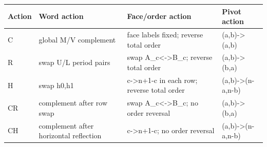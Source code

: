 \begin{tabular}{llll}
\toprule
Action & Word action & Face/order action & Pivot action \\
\midrule
C & global M/V complement & face labels fixed; reverse total order & (a,b)->(a,b) \\
R & swap U/L period pairs & swap A\_c<->B\_c; reverse total order & (a,b)->(b,a) \\
H & swap h0,h1 & c->n+1-c in each row; reverse total order & (a,b)->(n-a,n-b) \\
CR & complement after row swap & swap A\_c<->B\_c; no order reversal & (a,b)->(b,a) \\
CH & complement after horizontal reflection & c->n+1-c; no order reversal & (a,b)->(n-a,n-b) \\
\bottomrule
\end{tabular}
